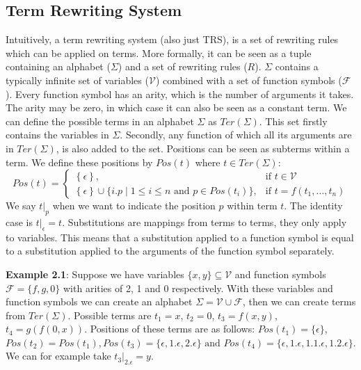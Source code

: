 \subsection{Term Rewriting System}
Intuitively, a term rewriting system (also just TRS), is a set of rewriting rules which can be applied on terms. More formally, it can be seen as a tuple containing an alphabet ($\Sigma$) and a set of rewriting rules ($R$). $\Sigma$ contains a typically infinite set of variables ($\mathcal{V}$) combined with a set of function symbols ($\mathcal{F}$). Every function symbol has an arity, which is the number of arguments it takes. The arity may be zero, in which case it can also be seen as a constant term.\newline
We can define the possible terms in an alphabet $\Sigma$ as $\textit{Ter}\left(\Sigma\right)$. This set firstly contains the variables in $\Sigma$. Secondly, any function of which all its arguments are in $\textit{Ter}\left(\Sigma\right)$, is also added to the set.\newline
Positions can be seen as subterms within a term. We define these positions by $\textit{Pos}\left(t\right)$ where $t \in \textit{Ter}\left(\Sigma\right)$:\newline
$$
\textit{Pos}(t) = \left\{\begin{array}{ll}
        \left\{\epsilon\right\}, & \text{if } t \in \mathcal{V}\\
        \left\{\epsilon\right\} \cup \{i.p \mid 1 \leq i \leq n \text{ and } p  \in \textit{Pos}(t_i)\} , & \text{if } t = f(t_1, \dots, t_n)
        \end{array}\right.
$$
We say $\left.t\right|_p$ when we want to indicate the position $p$ within term $t$. The identity case is $\left.t\right|_\epsilon = t$.\newline
Substitutions are mappings from terms to terms, they only apply to variables. This means that a substitution applied to a function symbol is equal to a substitution applied to the arguments of the function symbol separately.\newline

\textbf{Example 2.1}: Suppose we have variables $\{ x, y \} \subseteq \mathcal{V}$ and function symbols $\mathcal{F} = \{ f, g, 0\}$ with arities of 2, 1 and 0 respectively. With these variables and function symbols we can create an alphabet $\Sigma = \mathcal{V} \cup \mathcal{F}$, then we can create terms from $\textit{Ter}(\Sigma)$. Possible terms are $t_1 = x$, $t_2 = 0$, $t_3 = f(x, y)$, $t_4 = g(f(0, x))$. Positions of these terms are as follows: $\textit{Pos}(t_1) = \{ \epsilon \}$, $\textit{Pos}(t_2) = \textit{Pos}(t_1), \textit{Pos}(t_3) = \{ \epsilon, 1.\epsilon, 2.\epsilon \} \text{ and }\textit{Pos}(t_4) = \{ \epsilon, 1.\epsilon, 1.1.\epsilon, 1.2.\epsilon \}$. We can for example take $\left. t_3\right|_{2.\epsilon} = y$.\newline

